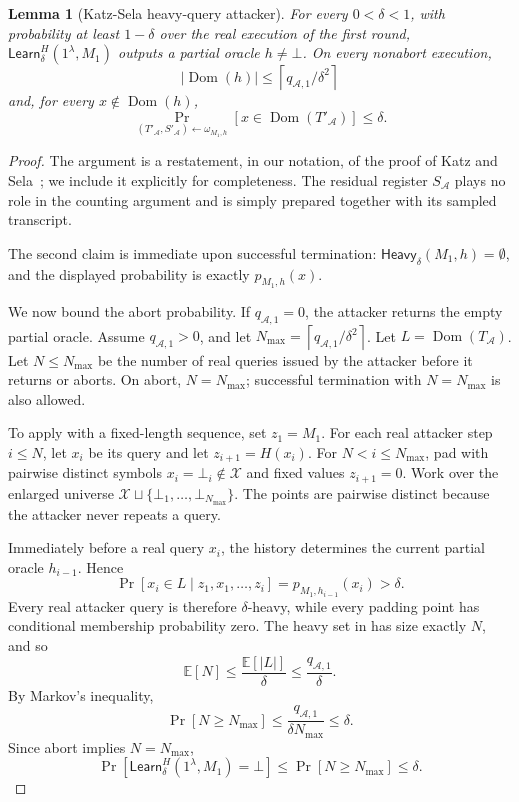 \documentclass[11pt]{article}
\newtheorem{lemma}[lemma]{Lemma}
\newcommand{\cA}{\mathcal{A}}
\newcommand{\cX}{\mathcal{X}}
\newcommand{\Dom}{\operatorname{Dom}}
\newcommand{\Learn}{\mathsf{Learn}}
\newcommand{\Heavy}{\mathsf{Heavy}}
\newcommand{\ceil}[1]{\left\lceil #1\right\rceil}
\begin{document}
\begin{lemma}[Katz-Sela heavy-query attacker]\label{lem:learn-success}
For every \(0<\delta<1\), with probability at least \(1-\delta\) over the
real execution of the first round, \(\Learn_\delta^H(1^\lambda,M_1)\) outputs a
partial oracle \(h\neq\bot\).  On every nonabort execution,
\[
  |\Dom(h)|\le\ceil{q_{\cA,1}/\delta^2}
\]
and, for every \(x\notin\Dom(h)\),
\[
  \Pr_{(T'_{\cA},S'_{\cA})\leftarrow\omega_{M_1,h}}
  [x\in\Dom(T'_{\cA})]
  \le\delta.
\]
\end{lemma}

\begin{proof}
The argument is a restatement, in our notation, of the proof of Katz and
Sela~\cite[Lemma~5]{KatzSela24}; we include it explicitly for completeness.
The residual register \(S_{\cA}\) plays no role in the counting argument and
is simply prepared together with its sampled transcript.

The second claim is immediate upon successful termination:
\(\Heavy_\delta(M_1,h)=\emptyset\), and the displayed probability is exactly
\(p_{M_1,h}(x)\).

We now bound the abort probability. If \(q_{\cA,1}=0\), the attacker
returns the empty partial oracle. Assume \(q_{\cA,1}>0\), and let
\(N_{\max}=\ceil{q_{\cA,1}/\delta^2}\). Let
\(L=\Dom(T_{\cA})\). Let \(N\le N_{\max}\) be the number of real queries
issued by the attacker before it returns or aborts. On abort,
\(N=N_{\max}\); successful termination with \(N=N_{\max}\) is also allowed.

To apply  with a fixed-length sequence, set
\(z_1=M_1\). For each real attacker step \(i\le N\), let \(x_i\) be its
query and let \(z_{i+1}=H(x_i)\). For \(N<i\le N_{\max}\), pad with pairwise
distinct symbols \(x_i=\bot_i\notin\cX\) and fixed values
\(z_{i+1}=0\). Work over the enlarged universe
\(\cX\sqcup\{\bot_1,\ldots,\bot_{N_{\max}}\}\). The points are pairwise
distinct because the attacker never repeats a query.

Immediately before a real query \(x_i\), the history determines the current
partial oracle \(h_{i-1}\). Hence
\[
  \Pr[x_i\in L\mid z_1,x_1,\ldots,z_i]
  =p_{M_1,h_{i-1}}(x_i)>\delta.
\]
Every real attacker query is therefore \(\delta\)-heavy, while every padding
point has conditional membership probability zero. The heavy set in
 has size exactly \(N\), and so
\[
  \mathbb{E}[N]
  \le
  \frac{\mathbb{E}[|L|]}{\delta}
  \le
  \frac{q_{\cA,1}}{\delta}.
\]
By Markov's inequality,
\[
  \Pr[N\ge N_{\max}]
  \le
  \frac{q_{\cA,1}}{\delta N_{\max}}
  \le\delta.
\]
Since abort implies \(N=N_{\max}\),
\[
  \Pr[\Learn_\delta^H(1^\lambda,M_1)=\bot]
  \le \Pr[N\ge N_{\max}]
  \le \delta.
\]
\end{proof}
\end{document}
